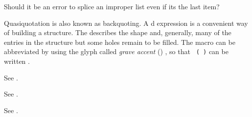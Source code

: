 \gdef\module{syntax-0}
\label{backquote}
%
\begin{optPrivate}
    Should it be an error to splice an improper list even if its the last item?
\end{optPrivate}
%
\begin{optDefinition}

%
\Syntax
{}%
%
\remarks%
Quasiquotation is also known as backquoting.  A d
expression is a convenient way of building a structure.  The 
describes the shape and, generally, many of the entries in the structure but
some holes remain to be filled.  The  macro can be
abbreviated by using the glyph called {\em grave accent} ()
, so that {\tt
    ( )} can be written
.

%
\remarks%
See .

\Syntax
{}%
%
\remarks%
See .

\syntaxform{,}
%
\remarks%
See .


\end{optDefinition}
